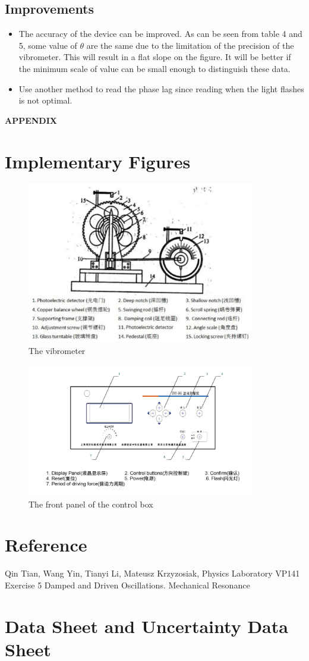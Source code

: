 \documentclass[12pt,a4paper]{article}
\begin{document}
\subsection{Improvements}
\begin{itemize}
    \item 	The accuracy of the device can be improved. As can be seen from table 4 and 5, some value of $\theta$ are the same due to the limitation of the precision of the vibrometer. This will result in a flat slope on the figure. It will be better if the minimum scale of value can be small enough to distinguish these data.
    \item Use another method to read the phase lag since reading when the light flashes is not optimal.
\end{itemize}


\newpage
{\LARGE\textbf{APPENDIX}}
\setcounter{section}{0}
\renewcommand\thesection{\Alph{section}}

\section{Implementary Figures}
\begin{figure}[H]
    \centering
    \includegraphics[width=10cm]{vibrometer.png}
    \caption{The vibrometer}
\end{figure}

\begin{figure}[H]
    \centering
    \includegraphics[width=10cm]{Front.png}
    \caption{The front panel of the control box}
\end{figure}

\section{Reference}
Qin Tian, Wang Yin, Tianyi Li, Mateusz Krzyzosiak, Physics Laboratory VP141 Exercise 5
Damped and Driven Oscillations. Mechanical Resonance

\section{Data Sheet and Uncertainty Data Sheet}
\end{document}

